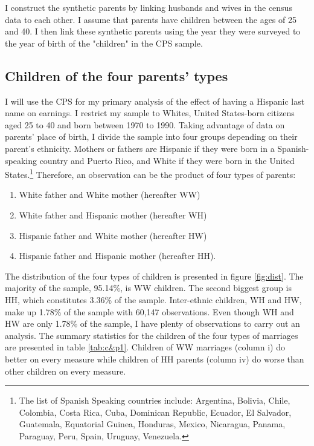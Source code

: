 \documentclass[12pt, fullpage]{article}
\begin{document}
I construct the synthetic parents by linking husbands and wives in the census data to each other. I assume that parents have children between the ages of 25 and 40. I then link these synthetic parents using the year they were surveyed to the year of birth of the "children" in the CPS sample.

\subsection{Children of the four parents' types}
I will use the CPS for my primary analysis of the effect of having a Hispanic last name on earnings. I restrict my sample to Whites, United States-born citizens aged 25 to 40 and born between 1970 to 1990. Taking advantage of data on parents' place of birth, I divide the sample into four groups depending on their parent's ethnicity. Mothers or fathers are Hispanic if they were born in a Spanish-speaking country and Puerto Rico, and White if they were born in the United States.\footnote{The list of Spanish Speaking countries include: Argentina, Bolivia, Chile, Colombia, Costa Rica, Cuba, Dominican Republic, Ecuador, El Salvador, Guatemala, Equatorial Guinea, Honduras, Mexico, Nicaragua, Panama, Paraguay, Peru, Spain, Uruguay, Venezuela.} Therefore, an observation can be the product of four types of parents: 
\begin{enumerate}
\item White father and White mother (hereafter WW) 
\item White father and Hispanic mother (hereafter WH)
\item Hispanic father and White mother (hereafter HW)
\item Hispanic father and Hispanic mother (hereafter HH).
\end{enumerate}
The distribution of the four types of children is presented in figure \ref{fig:dist}. The majority of the sample, 95.14\%, is WW children. The second biggest group is HH, which constitutes 3.36\% of the sample. Inter-ethnic children, WH and HW, make up 1.78\% of the sample with 60,147 observations. Even though WH and HW are only 1.78\% of the sample, I have plenty of observations to carry out an analysis. The summary statistics for the children of the four types of marriages are presented in table \ref{tab:c&p1}. Children of WW marriages (column i) do better on every measure while children of HH parents (column iv) do worse than other children on every measure. 
\end{document}
